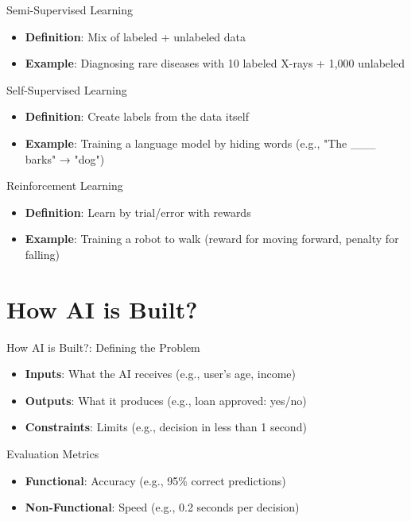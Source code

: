\documentclass{beamer}
\begin{document}
\begin{frame}{Semi-Supervised Learning}
\begin{itemize}
\item \textbf{Definition}: Mix of labeled + unlabeled data
\item \textbf{Example}: Diagnosing rare diseases with 10 labeled X-rays + 1,000 unlabeled
\end{itemize}
\end{frame}

\begin{frame}{Self-Supervised Learning}
\begin{itemize}
\item \textbf{Definition}: Create labels from the data itself
\item \textbf{Example}: Training a language model by hiding words (e.g., "The \_\_\_ barks" → "dog")
\end{itemize}
\end{frame}

\begin{frame}{Reinforcement Learning}
\begin{itemize}
\item \textbf{Definition}: Learn by trial/error with rewards
\item \textbf{Example}: Training a robot to walk (reward for moving forward, penalty for falling)
\end{itemize}
\end{frame}

\section{How AI is Built?}
\begin{frame}{How AI is Built?: Defining the Problem}
\begin{itemize}
\item \textbf{Inputs}: What the AI receives (e.g., user's age, income)
\item \textbf{Outputs}: What it produces (e.g., loan approved: yes/no)
\item \textbf{Constraints}: Limits (e.g., decision in less than 1 second)
\end{itemize}
\end{frame}

\begin{frame}{Evaluation Metrics}
\begin{itemize}
\item \textbf{Functional}: Accuracy (e.g., 95\% correct predictions)
\item \textbf{Non-Functional}: Speed (e.g., 0.2 seconds per decision)
\end{itemize}
\end{frame}
\end{document}
